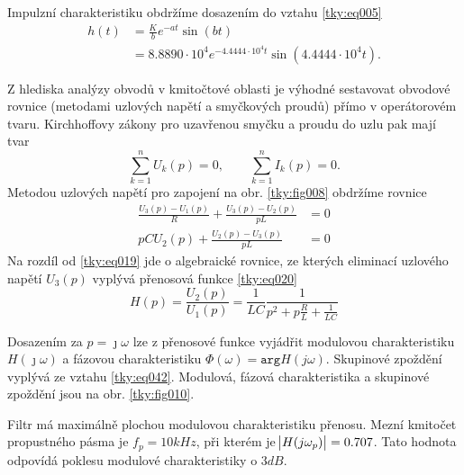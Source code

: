 \begin{mdframed}[style=mdexam]
\begin{example}
    Impulzní charakteristiku obdržíme dosazením do vztahu \ref{tky:eq005}
    \begin{align*}
      h(t)&=\frac{K}{b}e^{-at}\sin(bt)                                      \\
          &=8.8890\cdot10^4e^{-4.4444\cdot10^4t}\sin(4.4444\cdot10^4t).
    \end{align*}
        
      {\centering
      \captionsetup{type=figure}
      \label{tky:fig009}
      \par}
    
    Z hlediska analýzy obvodů v kmitočtové oblasti je výhodné sestavovat obvodové rovnice (metodami
    uzlových napětí a smyčkových proudů) přímo v operátorovém tvaru. Kirchhoffovy zákony pro
    uzavřenou smyčku a proudu do uzlu pak mají tvar $$\sum_{k=1}^{n}U_k(p) = 0, \qquad
    \sum_{k=1}^{n}I_k(p) = 0.$$ Metodou uzlových napětí pro zapojení na obr. \ref{tky:fig008}
    obdržíme rovnice
    \begin{align}
      \frac{U_3(p)-U_1(p)}{R}+\frac{U_3(p)-U_2(p)}{pL} &=  0 \\
      pCU_2(p) + \frac{U_2(p)-U_3(p)}{pL}              &=  0 
    \end{align}
    Na rozdíl od \ref{tky:eq019} jde o algebraické rovnice, ze kterých eliminací uzlového napětí
    $U_3(p)$ vyplývá přenosová funkce \ref{tky:eq020} $$H(p) = \frac{U_2(p)}{U_1(p)} =
    \frac{1}{LC}\frac{1}{p^2+p\frac{R}{L} + \frac{1}{LC}}$$
    
    {\centering
      \captionsetup{type=figure}
      \label{tky:fig010}
      \par}    
    
    Dosazením za $p=\jmath\omega$ lze z přenosové funkce vyjádřit modulovou charakteristiku
    $H(\jmath\omega)$ a fázovou charakteristiku $\Phi(\omega)= \texttt{arg} H(j\omega)$. Skupinové
    zpoždění vyplývá ze vztahu \ref{tky:eq042}. Modulová, fázová charakteristika a
    skupinové zpoždění jsou na obr. \ref{tky:fig010}.
    
    Filtr má maximálně plochou modulovou charakteristiku přenosu. Mezní kmitočet propustného pásma
    je $f_p = 10 kHz$, při kterém je $\abs{H(j\omega_p)}= 0.707$. Tato hodnota odpovídá poklesu
    modulové charakteristiky o $3 dB$.
    
  \end{example} 
  
  
\end{mdframed}
